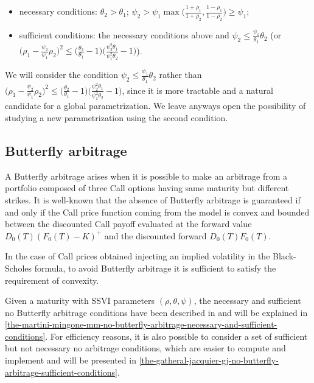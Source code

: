 \documentclass{article}
\providecommand{\tightlist}{%
      \setlength{\itemsep}{0pt}\setlength{\parskip}{0pt}}
\begin{document}
\begin{itemize}
\tightlist
\item
  necessary conditions: \(\theta_2>\theta_1\);
  \(\psi_2>\psi_1\max\bigl(\frac{1+\rho_1}{1+\rho_2},\frac{1-\rho_1}{1-\rho_2}\bigr)\geq\psi_1\);
\item
  sufficient conditions: the necessary conditions above and
  \(\psi_2\leq\frac{\psi_1}{\theta_1}\theta_2\) (or
  \(\bigl(\rho_1-\frac{\psi_2}{\psi_1}\rho_2\bigr)^2\leq\bigl(\frac{\theta_2}{\theta_1}-1\bigr)\bigl(\frac{\psi_2^2\theta_1}{\psi_1^2\theta_2}-1\bigr)\)).
\end{itemize}

We will consider the condition
\(\psi_2\leq\frac{\psi_1}{\theta_1}\theta_2\) rather than
\(\bigl(\rho_1-\frac{\psi_2}{\psi_1}\rho_2\bigr)^2\leq\bigl(\frac{\theta_2}{\theta_1}-1\bigr)\bigl(\frac{\psi_2^2\theta_1}{\psi_1^2\theta_2}-1\bigr)\),
since it is more tractable and a natural candidate for a global
parametrization. We leave anyways open the possibility of studying a new
parametrization using the second condition.

	\hypertarget{butterfly-arbitrage}{%
\subsection{Butterfly arbitrage}\label{butterfly-arbitrage}}

	A Butterfly arbitrage arises when it is possible to make an arbitrage
from a portfolio composed of three Call options having same maturity but
different strikes. It is well-known that the absence of Butterfly
arbitrage is guaranteed if and only if the Call price function coming
from the model is convex and bounded between the discounted Call payoff
evaluated at the forward value \(D_0(T)(F_0(T)-K)^+\) and the discounted
forward \(D_0(T)F_0(T)\).

	In the case of Call prices obtained injecting an implied volatility in
the Black-Scholes formula, to avoid Butterfly arbitrage it is sufficient
to satisfy the requirement of convexity.

Given a maturity with SSVI parameters \((\rho,\theta,\psi)\), the
necessary and sufficient no Butterfly arbitrage conditions have been
described in \cite{martini2021explicit} and will be explained in
\cref{the-martini-mingone-mm-no-butterfly-arbitrage-necessary-and-sufficient-conditions}.
For efficiency reasons, it is also possible to consider a set of
sufficient but not necessary no arbitrage conditions, which are easier
to compute and implement and will be presented in
\cref{the-gatheral-jacquier-gj-no-butterfly-arbitrage-sufficient-conditions}.
\end{document}
